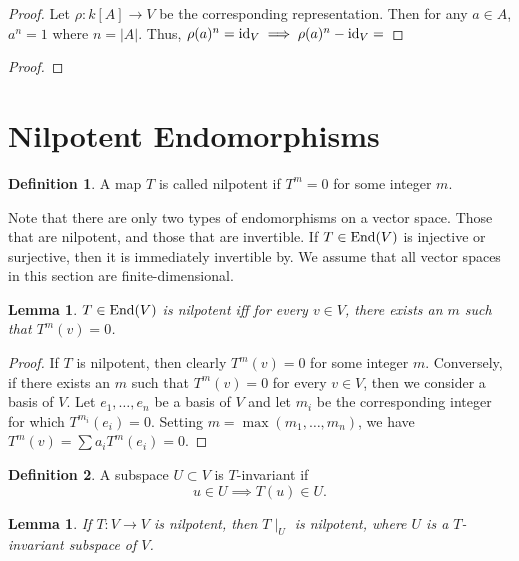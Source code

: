 \documentclass[12pt]{article}
\theoremstyle{definition}
\newtheorem{definition}{Definition}[section]
\theoremstyle{plain}
\newtheorem{lemma}[theorem]{Lemma}
\numberwithin{equation}{section}
\theoremstyle{definition}
\begin{document}
\begin{proof}
Let $ \rho : k[A] \to V $ be the corresponding representation. Then for any $a \in A$, $a^n = 1$ where $n = |A|$. Thus, $\rho(a)^n = \operatorname{id}_V \implies \rho(a)^n - \operatorname{id}_V = $
\end{proof}

\begin{proof}

\end{proof}

\section{Nilpotent Endomorphisms}

\begin{definition}
A map $ T $ is called nilpotent if $ T^m = 0 $ for some integer $ m $.
\end{definition}

Note that there are only two types of endomorphisms on a vector space. Those that are nilpotent, and those that are invertible. If $ T \in \operatorname{End}(V)$ is injective or surjective, then it is immediately invertible by. We assume that all vector spaces in this section are finite-dimensional.

\begin{lemma}
$ T \in \operatorname{End}(V)$ is nilpotent iff for every $ v \in V $, there exists an $ m $ such that $ T^m(v) = 0 $.
\end{lemma}

\begin{proof}
	If $ T $ is nilpotent, then clearly $ T^m(v) = 0 $ for some integer $ m $. Conversely, if there exists an $ m $ such that $ T^m(v) =0 $ for every $ v \in V $, then we consider a basis of $ V $. Let $ e_1, \ldots, e_n $ be a basis of $ V $ and let $ m_i $ be the corresponding integer for which $ T^{m_i}(e_i) = 0 $. Setting $ m = \max (m_1, \ldots, m_n) $, we have $ T^m(v) = \sum a_i T^m(e_i) = 0 $.
\end{proof}

\begin{definition}
A subspace $ U \subset V $ is $ T $-invariant if 
\[ u \in U \implies T(u) \in U. \]
\end{definition}

\begin{lemma}
If $ T : V \to V $ is nilpotent, then $ T \mid_U $ is nilpotent, where $ U $ is a $ T $-invariant subspace of $ V $.
\end{lemma}
\end{document}
